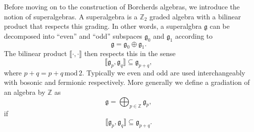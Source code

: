 \documentclass[11pt]{report}
\begin{document}
Before moving on to the construction of Borcherds algebras, we introduce the notion of superalgebras. A superalgebra is a $\mathbb{Z}_2$ graded algebra with a bilinear product that respects this grading. In other words, a superalgbra $\mathfrak{g}$ can be decomposed into ``even'' and ``odd'' subspaces $\mathfrak{g}_0$ and $\mathfrak{g}_1$ according to 
\begin{equation}
    \mathfrak{g} = \mathfrak{g}_0\oplus\mathfrak{g}_1.
\end{equation}
The bilinear product $\llbracket\cdot,\cdot\rrbracket$ then respects this in the sense
\begin{equation}
    \llbracket\mathfrak{g}_p,\mathfrak{g}_q\rrbracket \subseteq \mathfrak{g}_{p+q},
\end{equation}
where $p+q = p+q\,\text{mod}\,2$. Typically we even and odd are used interchangeably with bosonic and fermionic respectively. More generally we define a gradiation of an algebra by $\mathbb{Z}$ as 
\begin{equation}
    \mathfrak{g} = \bigoplus_{p\in\mathbb{Z}} \mathfrak{g}_{p},
\end{equation}
if
\begin{equation}
    \llbracket \mathfrak{g}_p,\mathfrak{g}_q\rrbracket\subseteq \mathfrak{g}_{p+q}.
\end{equation}
\end{document}
